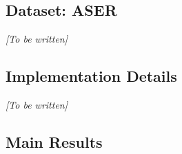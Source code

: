 \documentclass{article} %
\begin{document}
%
%
%
\subsection{Dataset: ASER}
\textit{[To be written]}

\subsection{Implementation Details}
\textit{[To be written]}

\subsection{Main Results}
\end{document}
